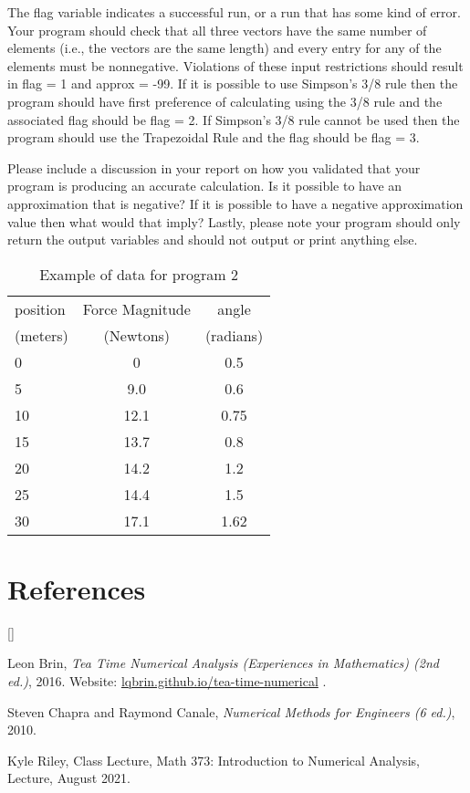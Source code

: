 \documentclass{article}
\def\beginrefs{\begin{list}%
        {[\arabic{equation}]}{\usecounter{equation}
         \setlength{\leftmargin}{2.0truecm}\setlength{\labelsep}{0.4truecm}%
         \setlength{\labelwidth}{1.6truecm}}}
\def\endrefs{\end{list}}
\def\bibentry#1{\item[\hbox{[#1]}]}
\begin{document}
The flag variable indicates a successful run, or a run that has some kind of error. Your program should check that all three vectors have the same number of elements (i.e., the vectors are the same length) and every entry for any of the elements must be nonnegative. Violations of these input restrictions should result in flag = 1 and approx = -99. If it is possible to use Simpson's 3/8 rule then the program should have first preference of calculating using the 3/8 rule and the associated flag should be flag = 2. If Simpson's 3/8 rule cannot be used then the program should use the Trapezoidal Rule and the flag should be flag = 3.

Please include a discussion in your report on how you validated that your program is producing an accurate calculation. Is it possible to have an approximation that is negative? If it is possible to have a negative approximation value then what would that imply?  Lastly, please note your program should only return the output variables and should not output or print anything else. 

\begin{table}[ht]
    \centering
     \begin{tabular}{|l|c|c|}
      \hline
      position & Force Magnitude & angle\\
      (meters) & (Newtons) & (radians) \\
      \hline
      0 & 0 & 0.5 \\
      \hline
      5 & 9.0 & 0.6 \\
      \hline
      10 & 12.1 & 0.75 \\
      \hline
      15 & 13.7 & 0.8 \\
      \hline
      20 & 14.2 & 1.2 \\
      \hline
      25 & 14.4 & 1.5 \\
      \hline
      30 & 17.1 & 1.62 \\
      \hline
    \end{tabular}
    \caption{Example of data for program 2}
    \label{t:example_data}
\end{table}

\par \bigskip \par

\section*{References}
\beginrefs

\bibentry{LB16}{\sc Leon Brin},
{\it Tea Time Numerical Analysis (Experiences in Mathematics)  (2nd ed.)}, 2016. Website: \href{http://lqbrin.github.io/tea-time-numerical/}{lqbrin.github.io/tea-time-numerical} .

\bibentry{CC10}{\sc Steven Chapra} and {\sc Raymond Canale}, {\it Numerical Methods for Engineers (6 ed.)}, 2010.

\bibentry{KR21} {\sc Kyle Riley}, Class Lecture, Math 373: Introduction to Numerical Analysis, Lecture, August 2021. 
\endrefs
\par \bigskip \noindent
\end{document}
